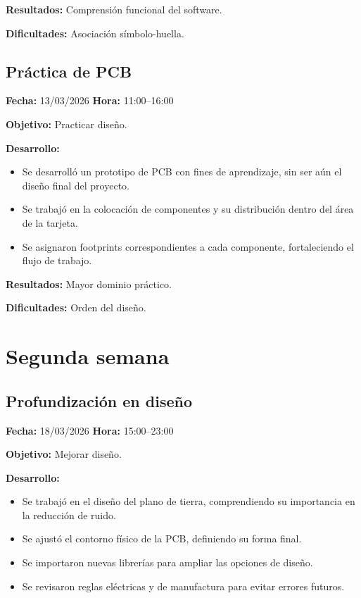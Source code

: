 \documentclass[12pt]{article}
\begin{document}
\textbf{Resultados:}
Comprensión funcional del software.

\textbf{Dificultades:}
Asociación símbolo-huella.

\subsection{Práctica de PCB}
\textbf{Fecha:} 13/03/2026 \quad \textbf{Hora:} 11:00--16:00

\textbf{Objetivo:}
Practicar diseño.

\textbf{Desarrollo:}
\begin{itemize}
\item Se desarrolló un prototipo de PCB con fines de aprendizaje, sin ser aún el diseño final del proyecto.
\item Se trabajó en la colocación de componentes y su distribución dentro del área de la tarjeta.
\item Se asignaron footprints correspondientes a cada componente, fortaleciendo el flujo de trabajo.
\end{itemize}

\textbf{Resultados:}
Mayor dominio práctico.

\textbf{Dificultades:}
Orden del diseño.

\section{Segunda semana}

\subsection{Profundización en diseño}
\textbf{Fecha:} 18/03/2026 \quad \textbf{Hora:} 15:00--23:00

\textbf{Objetivo:}
Mejorar diseño.

\textbf{Desarrollo:}
\begin{itemize}
\item Se trabajó en el diseño del plano de tierra, comprendiendo su importancia en la reducción de ruido.
\item Se ajustó el contorno físico de la PCB, definiendo su forma final.
\item Se importaron nuevas librerías para ampliar las opciones de diseño.
\item Se revisaron reglas eléctricas y de manufactura para evitar errores futuros.
\end{itemize}
\end{document}
